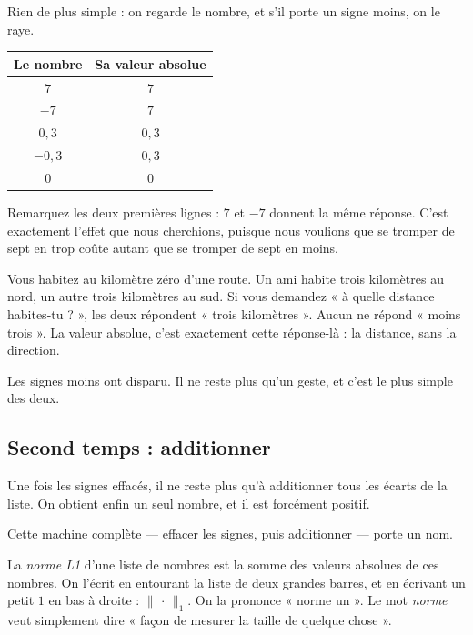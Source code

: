 \begin{exemple}
Rien de plus simple : on regarde le nombre, et s'il porte un signe moins, on
le raye.

\begin{center}
\footnotesize
\begin{tabular}{cc}
\toprule
\textbf{Le nombre} & \textbf{Sa valeur absolue} \\
\midrule
$7$        & $7$ \\
$-7$       & $7$ \\
$0{,}3$    & $0{,}3$ \\
$-0{,}3$   & $0{,}3$ \\
$0$        & $0$ \\
\bottomrule
\end{tabular}
\end{center}

Remarquez les deux premières lignes : $7$ et $-7$ donnent la même réponse.
C'est exactement l'effet que nous cherchions, puisque nous voulions que se
tromper de sept en trop coûte autant que se tromper de sept en moins.
\end{exemple}

\begin{intuition}
Vous habitez au kilomètre zéro d'une route. Un ami habite trois kilomètres
au nord, un autre trois kilomètres au sud. Si vous demandez « à quelle
distance habites-tu ? », les deux répondent « trois kilomètres ». Aucun ne
répond « moins trois ». La valeur absolue, c'est exactement cette
réponse-là : la distance, sans la direction.
\end{intuition}

Les signes moins ont disparu. Il ne reste plus qu'un geste, et c'est le plus
simple des deux.

\subsection*{Second temps : additionner}

Une fois les signes effacés, il ne reste plus qu'à additionner tous les
écarts de la liste. On obtient enfin un seul nombre, et il est forcément
positif.

Cette machine complète — effacer les signes, puis additionner — porte un
nom.

\begin{definition}[La norme L1][norme-l1]
La \emph{norme L1} d'une liste de nombres est la somme des valeurs absolues
de ces nombres. On l'écrit en entourant la liste de deux grandes barres, et
en écrivant un petit $1$ en bas à droite : $\|\,\cdot\,\|_{1}$. On la
prononce « norme un ». Le mot \emph{norme} veut simplement dire « façon de
mesurer la taille de quelque chose ».
\end{definition}

